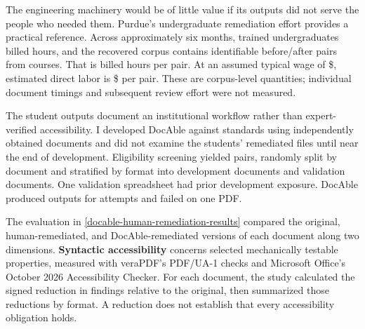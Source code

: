 
The engineering machinery would be of little value if its outputs did not serve the people who needed them. Purdue's undergraduate remediation effort provides a practical reference. Across approximately six months,  trained undergraduates billed  hours, and the recovered corpus contains  identifiable before/after pairs from  courses. That is  billed hours per pair. At an assumed typical wage of \$, estimated direct labor is \$ per pair. These are corpus-level quantities; individual document timings and subsequent review effort were not measured\citep{davis2026docable}.

The student outputs document an institutional workflow rather than expert-verified accessibility. I developed DocAble against standards using independently obtained documents and did not examine the students' remediated files until near the end of development. Eligibility screening yielded  pairs, randomly split by document and stratified by format into  development documents and  validation documents. One validation spreadsheet had prior development exposure. DocAble produced outputs for  attempts and failed on one PDF.


The evaluation in \autoref{docable-human-remediation-results} compared the original, human-remediated, and DocAble-remediated versions of each document along two dimensions. \textbf{Syntactic accessibility} concerns selected mechanically testable properties, measured with veraPDF's PDF/UA-1 checks and Microsoft Office's October 2026 Accessibility Checker. For each document, the study calculated the signed reduction in findings relative to the original, then summarized those reductions by format. A reduction does not establish that every accessibility obligation holds.

